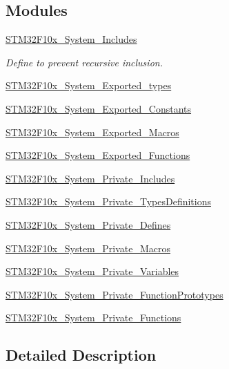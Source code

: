 \subsection*{Modules}
\begin{DoxyCompactItemize}
\item 
\hyperlink{group___s_t_m32_f10x___system___includes}{S\+T\+M32\+F10x\+\_\+\+System\+\_\+\+Includes}
\begin{DoxyCompactList}\small\item\em Define to prevent recursive inclusion. \end{DoxyCompactList}\item 
\hyperlink{group___s_t_m32_f10x___system___exported__types}{S\+T\+M32\+F10x\+\_\+\+System\+\_\+\+Exported\+\_\+types}
\item 
\hyperlink{group___s_t_m32_f10x___system___exported___constants}{S\+T\+M32\+F10x\+\_\+\+System\+\_\+\+Exported\+\_\+\+Constants}
\item 
\hyperlink{group___s_t_m32_f10x___system___exported___macros}{S\+T\+M32\+F10x\+\_\+\+System\+\_\+\+Exported\+\_\+\+Macros}
\item 
\hyperlink{group___s_t_m32_f10x___system___exported___functions}{S\+T\+M32\+F10x\+\_\+\+System\+\_\+\+Exported\+\_\+\+Functions}
\item 
\hyperlink{group___s_t_m32_f10x___system___private___includes}{S\+T\+M32\+F10x\+\_\+\+System\+\_\+\+Private\+\_\+\+Includes}
\item 
\hyperlink{group___s_t_m32_f10x___system___private___types_definitions}{S\+T\+M32\+F10x\+\_\+\+System\+\_\+\+Private\+\_\+\+Types\+Definitions}
\item 
\hyperlink{group___s_t_m32_f10x___system___private___defines}{S\+T\+M32\+F10x\+\_\+\+System\+\_\+\+Private\+\_\+\+Defines}
\item 
\hyperlink{group___s_t_m32_f10x___system___private___macros}{S\+T\+M32\+F10x\+\_\+\+System\+\_\+\+Private\+\_\+\+Macros}
\item 
\hyperlink{group___s_t_m32_f10x___system___private___variables}{S\+T\+M32\+F10x\+\_\+\+System\+\_\+\+Private\+\_\+\+Variables}
\item 
\hyperlink{group___s_t_m32_f10x___system___private___function_prototypes}{S\+T\+M32\+F10x\+\_\+\+System\+\_\+\+Private\+\_\+\+Function\+Prototypes}
\item 
\hyperlink{group___s_t_m32_f10x___system___private___functions}{S\+T\+M32\+F10x\+\_\+\+System\+\_\+\+Private\+\_\+\+Functions}
\end{DoxyCompactItemize}


\subsection{Detailed Description}
